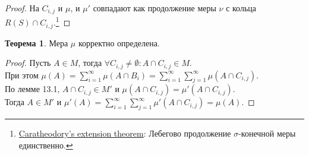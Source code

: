\documentclass[11pt,a4paper]{report}
\theoremstyle{definition}
\theoremstyle{definition}
\newtheorem{theorem}{Теорема}[section]
\theoremstyle{definition}
\begin{document}
	\begin{proof}
		На $ C_{i, j} $ и $ \mu $, и $ \mu' $ совпадают как продолжение меры $ \nu $ с кольца $ R(S) \cap C_{i, j} $.\footnote{\href{https://goo.gl/DLPJQ1}{Caratheodory's extension theorem}: Лебегово продолжение $ \sigma $-конечной меры единственно.}
	\end{proof}
	\begin{theorem}
		Мера $ \mu $ корректно определена.
	\end{theorem}
	\begin{proof}
		Пусть $ A \in M $, тогда $ \forall C_{i, j} \neq \emptyset: A \cap C_{i, j} \in M $.\\ 
		При этом
		$ \mu(A) = \sum\limits_{i=1}^{\infty}{\mu(A \cap B_{i})} = \sum\limits_{i=1}^{\infty}{\sum\limits_{j=1}^{\infty}{\mu(A \cap C_{i, j})}} $.\\
		По лемме 13.1, $ A \cap C_{i, j} \in M' $ и $ \mu(A \cap C_{i, j}) = \mu'(A \cap C_{i, j}) $.\\
		Тогда $ A \in M' $ и $ \mu'(A) =  \sum\limits_{i=1}^{\infty}{\sum\limits_{j=1}^{\infty}{\mu'(A \cap C_{i, j})}} = \mu(A) $.
	\end{proof}
\end{document}
